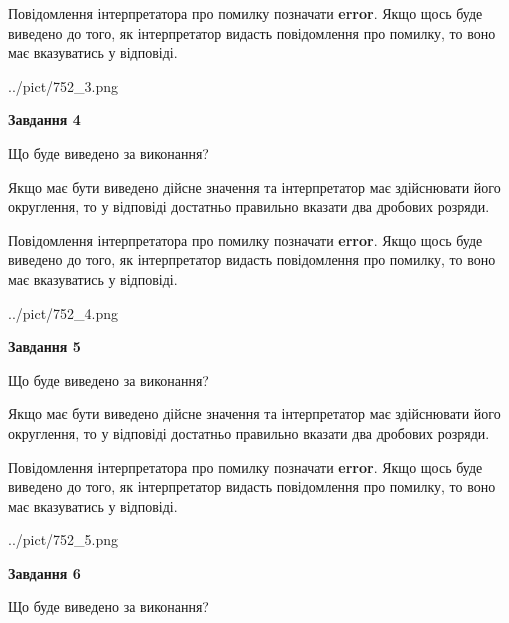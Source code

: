 \documentclass[12pt, ukrainian]{article}
\begin{document}
{\begin {Large}
Повідомлення інтерпретатора про помилку позначати \textbf{error}.
Якщо щось буде виведено до того, як інтерпретатор видасть повідомлення про помилку, 
то воно має вказуватись у відповіді. \par

\begin{center}
	{../pict/752_3.png}
\end{center}
\newpage

{\begin {center}\textbf{Завдання 4}\end {center}}\par
Що буде виведено за виконання? \par

Якщо має бути виведено дійсне значення та інтерпретатор має здійснювати його округлення, 
то у відповіді достатньо правильно вказати два дробових розряди.

Повідомлення інтерпретатора про помилку позначати \textbf{error}.
Якщо щось буде виведено до того, як інтерпретатор видасть повідомлення про помилку, 
то воно має вказуватись у відповіді. \par

\begin{center}
	{../pict/752_4.png}
\end{center}
\newpage

{\begin {center}\textbf{Завдання 5}\end {center}}\par
Що буде виведено за виконання? \par

Якщо має бути виведено дійсне значення та інтерпретатор має здійснювати його округлення, 
то у відповіді достатньо правильно вказати два дробових розряди.

Повідомлення інтерпретатора про помилку позначати \textbf{error}.
Якщо щось буде виведено до того, як інтерпретатор видасть повідомлення про помилку, 
то воно має вказуватись у відповіді. \par

\begin{center}
	{../pict/752_5.png}
\end{center}
\newpage

{\begin {center}\textbf{Завдання 6}\end {center}}\par
Що буде виведено за виконання? \par


\end{Large}}
\end{document}
